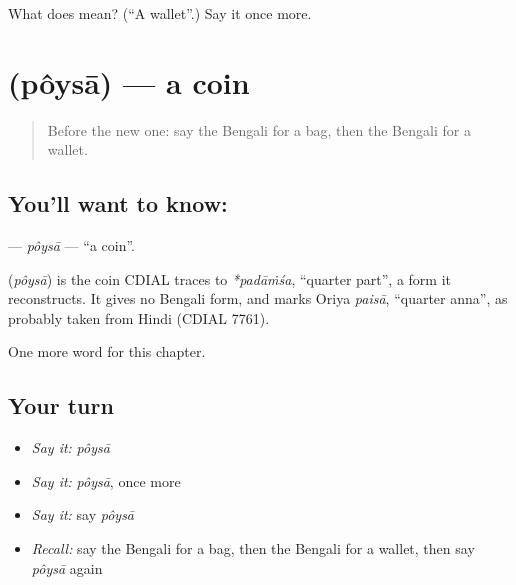 \begin{tcolorbox}[breakable,colback=teal!4,colframe=teal!35!black,title={Before you move on}]
What does  mean? (\textquotedblleft{}A wallet\textquotedblright{}.) Say it once more.
\end{tcolorbox}
\section[\texorpdfstring{\bn{পয়সা} (pôysā)}{পয়সা (pôysā)}]{ (pôysā) — a coin}

\label{lesson:BN-C130-poysa}



\begin{quote}
Before the new one: say the Bengali for a bag, then the Bengali for a wallet.
\end{quote}

\subsection*{You'll want to know: }
\textbf{} — \emph{pôysā} — \textquotedblleft{}a coin\textquotedblright{}.

\begin{cousinweb}
\textbf{} (\emph{pôysā}) is the coin CDIAL traces to \emph{*padāṁśa}, \textquotedblleft{}quarter part\textquotedblright{}, a form it reconstructs. It gives no Bengali form, and marks Oriya \emph{paisā}, \textquotedblleft{}quarter anna\textquotedblright{}, as probably taken from Hindi (CDIAL 7761).
\end{cousinweb}

\begin{grammarlens}[title={What you've built}]
One more word for this chapter.
\end{grammarlens}

\subsection*{Your turn}
\begin{itemize}
\raggedright
  \item \emph{Say it:} \emph{pôysā}
  \item \emph{Say it:} \emph{pôysā}, once more
  \item \emph{Say it:} say \emph{pôysā}
  \item \emph{Recall:} say the Bengali for a bag, then the Bengali for a wallet, then say \emph{pôysā} again
\end{itemize}

